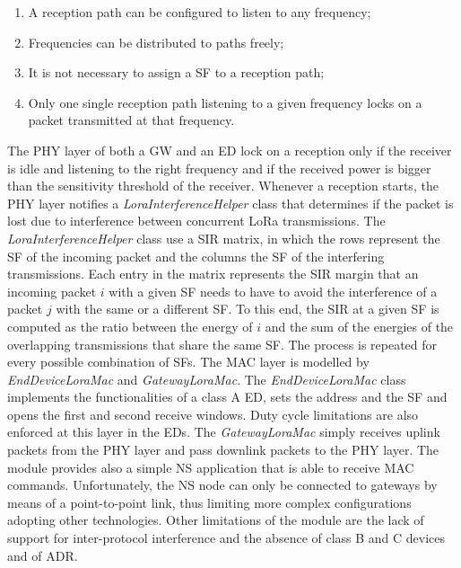 \begin{enumerate}
	\item A reception path can be configured to listen to any frequency;
	\item Frequencies can be distributed to paths freely;
	\item It is not necessary to assign a \gls{SF} to a reception path;
	\item Only one single reception path listening to a given frequency locks on a packet transmitted at that frequency.
\end{enumerate}

The PHY layer of both a \gls{GW} and an \gls{ED} lock on a reception only if the receiver is idle and listening to the right frequency and if the received power is bigger than the sensitivity threshold of the receiver. Whenever a reception starts, the PHY layer notifies a \textit{LoraInterferenceHelper} class that determines if the packet is lost due to interference between concurrent LoRa transmissions. The \textit{LoraInterferenceHelper} class use a \gls{SIR} matrix, in which the rows represent the \gls{SF} of the incoming packet and the columns the \gls{SF} of the interfering transmissions. Each entry in the matrix represents the \gls{SIR} margin that an incoming packet $i$ with a given \gls{SF} needs to have to avoid the interference of a packet $j$ with the same or a different \gls{SF}. To this end, the \gls{SIR} at a given \gls{SF} is computed as the ratio between the energy of $i$ and the sum of the energies of the overlapping transmissions that share the same \gls{SF}. The process is repeated for every possible combination of \glspl{SF}. The MAC layer is modelled by \textit{EndDeviceLoraMac} and \textit{GatewayLoraMac}. The \textit{EndDeviceLoraMac} class implements the functionalities of a class A \gls{ED}, sets the address and the \gls{SF} and opens the first and second receive windows. Duty cycle limitations are also enforced at this layer in the \glspl{ED}. The \textit{GatewayLoraMac} simply receives uplink packets from the PHY layer and pass downlink packets to the PHY layer. The module provides also a simple \gls{NS} application that is able to receive MAC commands. Unfortunately, the \gls{NS} node can only be connected to gateways by means of a point-to-point link, thus limiting more complex configurations adopting other technologies. Other limitations of the module are the lack of support for inter-protocol interference and the absence of class B and C devices and of \gls{ADR}. \\\\
